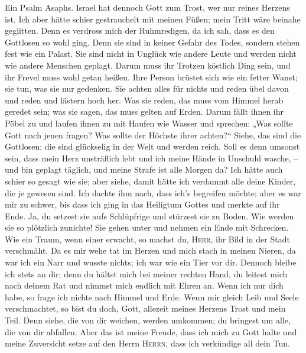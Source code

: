  Ein Psalm Asaphs. Israel hat dennoch Gott zum Trost, wer
nur reines Herzens ist.  Ich aber hätte schier
gestrauchelt mit meinen Füßen; mein Tritt wäre beinahe geglitten.
 Denn es verdross mich der Ruhmredigen, da ich sah, dass
es den Gottlosen so wohl ging.  Denn sie sind in keiner
Gefahr des Todes, sondern stehen fest wie ein Palast.  Sie
sind nicht in Unglück wie andere Leute und werden nicht wie andere
Menschen geplagt.  Darum muss ihr Trotzen köstlich Ding
sein, und ihr Frevel muss wohl getan heißen.  Ihre Person
brüstet sich wie ein fetter Wanst; sie tun, was sie nur gedenken.
 Sie achten alles für nichts und reden übel davon und
reden und lästern hoch her.  Was sie reden, das muss vom
Himmel herab geredet sein; was sie sagen, das muss gelten auf Erden.
 Darum fällt ihnen ihr Pöbel zu und laufen ihnen zu mit
Haufen wie Wasser  und sprechen: „Was sollte Gott nach
jenen fragen? Was sollte der Höchste ihrer achten?{}`` 
Siehe, das sind die Gottlosen; die sind glückselig in der Welt und
werden reich.  Soll es denn umsonst sein, dass mein Herz
unsträflich lebt und ich meine Hände in Unschuld wasche, --
 und bin geplagt täglich, und meine Strafe ist alle
Morgen da?  Ich hätte auch schier so gesagt wie sie; aber
siehe, damit hätte ich verdammt alle deine Kinder, die je gewesen sind.
 Ich dachte ihm nach, dass ich's begreifen möchte; aber
es war mir zu schwer,  bis dass ich ging in das Heiligtum
Gottes und merkte auf ihr Ende.  Ja, du setzest sie aufs
Schlüpfrige und stürzest sie zu Boden.  Wie werden sie so
plötzlich zunichte! Sie gehen unter und nehmen ein Ende mit Schrecken.
 Wie ein Traum, wenn einer erwacht, so machst du,
\textsc{Herr}, ihr Bild in der Stadt verschmäht.  Da es
mir wehe tat im Herzen und mich stach in meinen Nieren, 
da war ich ein Narr und wusste nichts; ich war wie ein Tier vor dir.
 Dennoch bleibe ich stets an dir; denn du hältst mich bei
meiner rechten Hand,  du leitest mich nach deinem Rat und
nimmst mich endlich mit Ehren an.  Wenn ich nur dich
habe, so frage ich nichts nach Himmel und Erde.  Wenn mir
gleich Leib und Seele verschmachtet, so bist du doch, Gott, allezeit
meines Herzens Trost und mein Teil.  Denn siehe, die von
dir weichen, werden umkommen; du bringest um alle, die von dir abfallen.
 Aber das ist meine Freude, dass ich mich zu Gott halte
und meine Zuversicht setze auf den Herrn \textsc{Herrn}, dass ich
verkündige all dein Tun.

